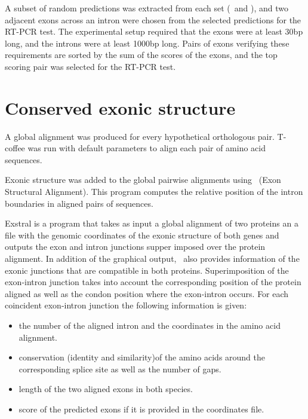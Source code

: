 A subset of random predictions was extracted from each set (\sgp\ and
\twinscan), and two adjacent exons across an intron were chosen from
the selected predictions for the RT-PCR test. The experimental setup
required that the exons were at least 30bp long, and the introns were
at least 1000bp long. Pairs of exons verifying these requirements are
sorted by the sum of the scores of the exons, and the top scoring pair
was selected for the RT-PCR test.

\section{Conserved exonic structure}

A global alignment was produced for every hypothetical orthologous
pair. T-coffee was run with default parameters to align each pair of
amino acid sequences.

Exonic structure was added to the global pairwise alignments using
\exstral\ (Exon Structural Alignment). This program computes the 
relative position of the intron boundaries in aligned pairs of
sequences.

Exstral is a program that takes as input a global alignment of two
proteins an a file with the genomic coordinates of the exonic
structure of both genes and outputs the exon and intron junctions
supper imposed over the protein alignment. In addition of the
graphical output, \exstral\ also provides information of the exonic
junctions that are compatible in both proteins. 
Superimposition of the exon-intron junction takes into account the
corresponding position of the protein aligned as well as the condon
position where the exon-intron occurs. For each coincident exon-intron
junction the following information is given:

\begin{itemize}

\item the number of the aligned intron and the coordinates in
the amino acid alignment.

\item conservation (identity and  similarity)of the amino acids
 around the corresponding splice site as well as the number of gaps.

\item length of the two aligned exons in both species.

\item score of the predicted exons if it is provided in the coordinates 
file.

\end{itemize}

